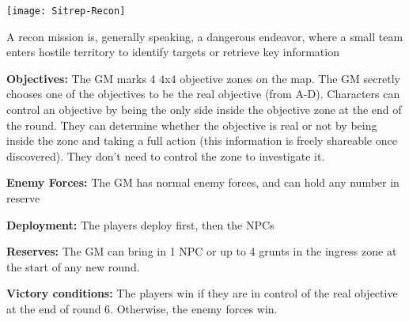 \begin{center}
  \texttt{[image: Sitrep-Recon]}
\end{center}

A recon mission is, generally speaking, a dangerous endeavor, where a small team enters hostile territory to identify targets or retrieve key information

\textbf{Objectives:} The GM marks 4 4x4 objective zones on the map. The GM secretly chooses one of the objectives to be the real objective (from A-D). Characters can control an objective by being the only side inside the objective zone at the end of the round. They can determine whether the objective is real or not by being inside the zone and taking a full action (this information is freely shareable once discovered). They don’t need to control the zone to investigate it.

\textbf{Enemy Forces:} The GM has normal enemy forces, and can hold any number in reserve

\textbf{Deployment:} The players deploy first, then the NPCs

\textbf{Reserves:} The GM can bring in 1 NPC or up to 4 grunts in the ingress zone at the start of any new round.

\textbf{Victory conditions:} The players win if they are in control of the real objective at the end of round 6. Otherwise, the enemy forces win.
